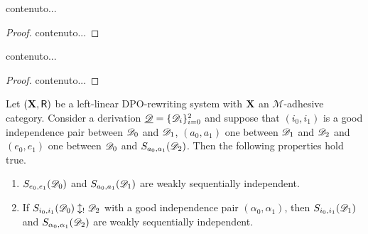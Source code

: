 \begin{lemma}\label{lem:secondo}
	contenuto...
\end{lemma}
\begin{proof}
	contenuto...
\end{proof}



\begin{lemma}\label{lem:terzo}
	contenuto...
\end{lemma}
\begin{proof}
	contenuto...
\end{proof}


\begin{lemma}\label{lem:iig1}Let $(\textbf {\textup{X}},\mathsf{R})$ be a left-linear DPO-rewriting system with $\textbf {\textup{X}}$ an $\mathcal{M}$-adhesive category. Consider a derivation $\underline{\mathscr{D}}=\{\mathscr{D}_i\}_{i=0}^2$ and suppose that $(i_0,i_1)$ is a good independence pair between $\mathscr{D}_0$ and $\mathscr{D}_1$, $(a_0,a_1)$ one between $\mathscr{D}_1$ and $\mathscr{D}_2$ and $(e_0, e_1)$ one between $\mathscr{D}_0$ and $S_{a_0,a_1}(\mathscr{D}_2)$. Then the following properties hold true.
	\begin{enumerate}
		\item $S_{e_0,e_1}(\mathscr{D}_0)$ and $S_{a_0,a_1}(\mathscr{D}_1)$ are weakly sequentially independent.
		\item If $S_{i_0, i_1}(\mathscr{D}_0)\updownarrow_! \mathscr{D}_2$ with a good independence pair $(\alpha_0, \alpha_1)$, then  $S_{i_0,i_1}(\mathscr{D}_1)$ and $S_{\alpha_0, \alpha_1}(\mathscr{D}_2)$ are weakly sequentially independent.
	\end{enumerate}
	
\end{lemma}
